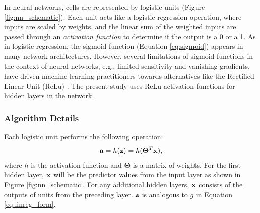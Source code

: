 In neural networks, cells are represented by logistic units (Figure \ref{fig:nn_schematic}). Each unit acts like a logistic regression operation, where inputs are scaled by weights, and the linear sum of the weighted inputs are passed through an \textit{activation function} to determine if the output is a 0 or a 1. As in logistic regression, the sigmoid function (Equation \ref{eq:sigmoid}) appears in many network architectures. However, several limitations of sigmoid functions in the context of neural networks, e.g., limited sensitivity and vanishing gradients, have driven machine learning practitioners towards alternatives like the Rectified Linear Unit (ReLu) \citep{brownlee_gentle_2019, nair_rectified_2010}. The present study uses ReLu activation functions for hidden layers in the network. 

\subsubsection{Algorithm Details} \label{ch3:ann_details}

Each logistic unit performs the following operation:
\begin{equation}
\label{eq:nn_activation}
    {\bf{a}} = h({\bf{z}}) = h({\boldsymbol\Theta}^T{\bf x}),
\end{equation}
where $h$ is the activation function and $\boldsymbol\Theta$ is a matrix of weights. For the first hidden layer, $\bf{x}$ will be the predictor values from the input layer as shown in Figure \ref{fig:nn_schematic}. For any additional hidden layers, $\bf{x}$ consists of the outputs of units from the preceding layer. $\bf{z}$ is analogous to \(g\) in Equation \ref{eq:linreg_form}.

